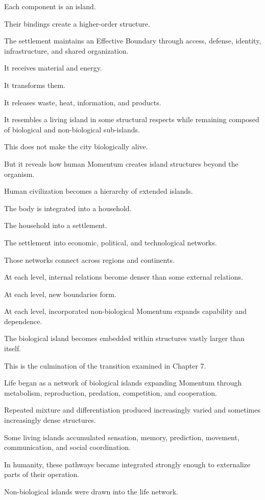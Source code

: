 Each component is an island.

Their bindings create a higher-order structure.

The settlement maintains an Effective Boundary through access, defense, identity, infrastructure, and shared organization.

It receives material and energy.

It transforms them.

It releases waste, heat, information, and products.

It resembles a living island in some structural respects while remaining composed of biological and non-biological sub-islands.

This does not make the city biologically alive.

But it reveals how human Momentum creates island structures beyond the organism.

Human civilization becomes a hierarchy of extended islands.

The body is integrated into a household.

The household into a settlement.

The settlement into economic, political, and technological networks.

Those networks connect across regions and continents.

At each level, internal relations become denser than some external relations.

At each level, new boundaries form.

At each level, incorporated non-biological Momentum expands capability and dependence.

The biological island becomes embedded within structures vastly larger than itself.

This is the culmination of the transition examined in Chapter 7.

Life began as a network of biological islands expanding Momentum through metabolism, reproduction, predation, competition, and cooperation.

Repeated mixture and differentiation produced increasingly varied and sometimes increasingly dense structures.

Some living islands accumulated sensation, memory, prediction, movement, communication, and social coordination.

In humanity, these pathways became integrated strongly enough to externalize parts of their operation.

Non-biological islands were drawn into the life network.

